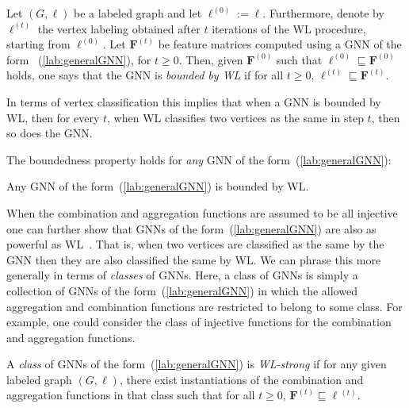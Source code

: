 \begin{definition}[Bounded by WL]\normalfont\label{def:wlupper}
Let $(G,\pmb{\ell})$ be a labeled graph and let $\pmb{\ell}^{(0)}:=\pmb{\ell}$. Furthermore, denote by 
$\pmb{\ell}^{(t)}$ the vertex labeling obtained after $t$ iterations of the WL procedure, starting from $\pmb{\ell}^{(0)}$. Let $\mathbf{F}^{(t)}$ be feature matrices computed using a GNN of the form ~(\ref{lab:generalGNN}), for $t\geq 0$. Then, given $\mathbf{F}^{(0)}$ such that $\pmb{\ell}^{(0)}\sqsubseteq \mathbf{F}^{(0)}$ holds, one says that the GNN  is \textit{bounded by WL} if for all $t\geq 0$, 
$\pmb{\ell}^{(t)}\sqsubseteq \mathbf{F}^{(t)}$.
\end{definition}
In terms of vertex classification this implies that when a GNN is bounded by WL, then 
for every $t$, when WL classifies two vertices as the same in step $t$, then so does the GNN. 

The boundedness property holds for \textit{any} GNN of the form~(\ref{lab:generalGNN}):
\begin{proposition}\label{prop:upperboundgeneral}
Any GNN of the form~(\ref{lab:generalGNN}) is bounded by WL.
\end{proposition}


When the combination and aggregation functions are assumed to be all injective one can further show that GNNs of the form~(\ref{lab:generalGNN}) are also as powerful as WL~\cite{DBLP:conf/iclr/XuHLJ19}. That is, when two vertices are classified as the same by the GNN then they are also classified the same by WL. 
We can phrase this more generally in terms of \textit{classes} of GNNs. Here, a class of GNNs is simply a collection of GNNs of the form~(\ref{lab:generalGNN}) in which the allowed aggregation and combination functions are restricted to belong to some class. For example, one could consider the class of injective functions for the combination and aggregation functions.

\begin{definition}[WL-strong]\normalfont\label{def:wlstrong}
A \textit{class} of GNNs of the form~(\ref{lab:generalGNN}) is \textit{WL-strong} if for any given labeled graph
	$(G,\pmb{\ell})$, there exist instantiations of the combination and aggregation functions in that class such that for all $t\geq 0$, $\mathbf{F}^{(t)}\sqsubseteq \pmb{\ell}{}^{(t)}$.
\end{definition}


